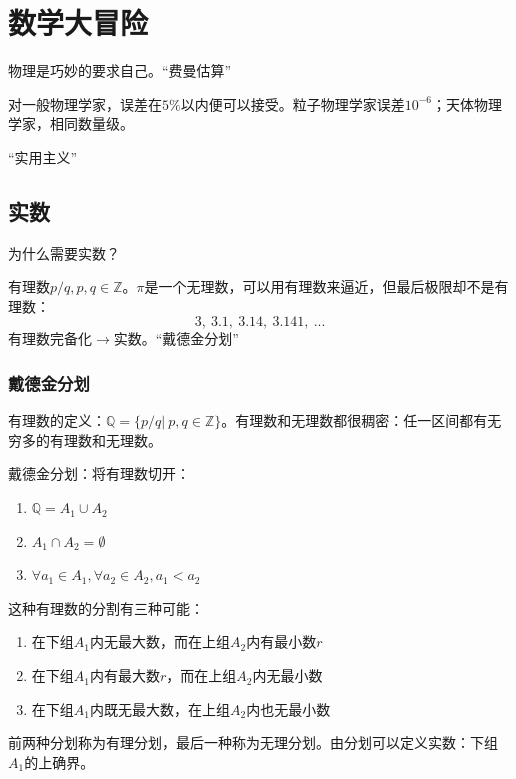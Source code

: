 % 
% 
\chapter{数学大冒险}
\label{Chap1}

物理是巧妙的要求自己。“费曼估算”

对一般物理学家，误差在$5\%$以内便可以接受。粒子物理学家误差$10^{-6}$；天体物理学家，相同数量级。

“实用主义”

\section{实数}
\label{ss}

为什么需要实数？

有理数$p/q, p,q\in \mathbb{Z}$。$\pi$是一个无理数，可以用有理数来逼近，但最后极限却不是有理数：
\[3,\ 3.1,\ 3.14,\ 3.141,\ ...\]
有理数完备化$\rightarrow$实数。“戴德金分划”

\subsection{戴德金分划}
\label{ddjfh}

有理数的定义：$\mathbb{Q} = \{p/q|\ p,q\in \mathbb{Z}\}$。有理数和无理数都很稠密：任一区间都有无穷多的有理数和无理数。

戴德金分划：将有理数切开：
\begin{enumerate}[fullwidth,itemindent=2em]
	\item $\mathbb{Q} = A_1\cup A_2$
	\item $A_1\cap A_2 = \emptyset$
	\item $\forall a_1\in A_1, \forall a_2\in A_2, a_1 < a_2$
\end{enumerate}

这种有理数的分割有三种可能：
\begin{enumerate}[fullwidth,itemindent=2em,label=(\arabic*)]
	\item 在下组$A_1$内无最大数，而在上组$A_2$内有最小数$r$
	\item 在下组$A_1$内有最大数$r$，而在上组$A_2$内无最小数
	\item 在下组$A_1$内既无最大数，在上组$A_2$内也无最小数
\end{enumerate}
前两种分划称为有理分划，最后一种称为无理分划。由分划可以定义实数：下组$A_1$的上确界。

